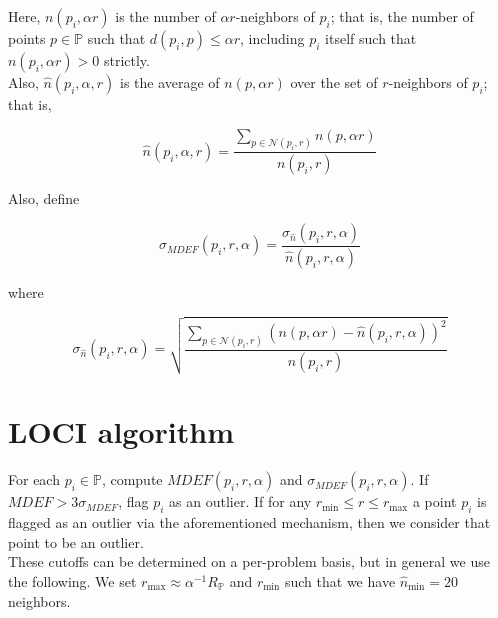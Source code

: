 \documentclass[12pt]{article}
\begin{document}
Here, $n(p_i, \alpha r)$ is the number of $\alpha r$-neighbors of $p_i$; that is, the number of points $p\in \mathbb{P}$ such that $d(p_i, p) \leq \alpha r$, including $p_i$ itself such that $n(p_i, \alpha r) > 0$ strictly.\\

Also, $\hat{n}(p_i, \alpha, r)$ is the average of $n(p, \alpha r)$ over the set of $r$-neighbors of $p_i$; that is,

\begin{equation}
\hat{n}(p_i, \alpha, r) = \frac{\sum_{p\in\mathcal{N}(p_i, r)} n(p, \alpha r)}{n(p_i, r)}
\end{equation}

Also, define

\begin{equation}
\sigma_{MDEF}(p_i, r, \alpha)= \frac{\sigma_{\hat{n}}(p_i, r, \alpha)}{\hat{n}(p_i, r, \alpha)}
\end{equation}

where

\begin{equation}
\sigma_{\hat{n}}(p_i, r, \alpha) = \sqrt{\frac{\sum_{p\in\mathcal{N}(p_i, r)}(n(p, \alpha r)-\hat{n}(p_i, r, \alpha))^2}{n(p_i, r)}}
\end{equation}

\section{LOCI algorithm}
For each $p_i\in\mathbb{P}$, compute $MDEF(p_i, r, \alpha)$ and $\sigma_{MDEF}(p_i, r, \alpha)$. If $MDEF > 3\sigma_{MDEF}$, flag $p_i$ as an outlier. If for any $r_{\textrm{min}} \leq r \leq r_{\textrm{max}}$ a point $p_i$ is flagged as an outlier via the aforementioned mechanism, then we consider that point to be an outlier.\\

These cutoffs can be determined on a per-problem basis, but in general we use the following. We set $r_{\textrm{max}} \approx \alpha^{-1}R_{\mathbb{P}}$ and $r_{\textrm{min}}$ such that we have $\hat{n}_{\textrm{min}} = 20$ neighbors.
\end{document}
